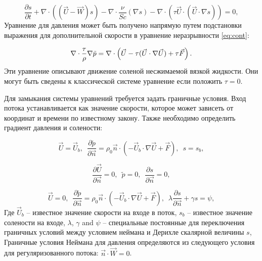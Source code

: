\begin{equation}
     \frac{\partial s }{\partial t} + \nabla \cdot \left ( (\vec U - \vec W) s \right )
      - \nabla \cdot \frac{\nu}{Sc} \left ( \nabla s \right ) - \nabla \cdot \left (\tau \vec{U} \cdot (\vec{U} \cdot \nabla s) \right) = 0,
\end{equation}
Уравнение для давления может быть получено напрямую путем подстановки выражения для дополнительной скорости в уравнение неразрывности \ref{eq:cont}:

\begin{equation}
     \nabla \cdot \frac{\tau}{\rho}\nabla \Tilde{p} = \nabla \cdot \left (   \vec{U} - \tau (\vec{U} \cdot \nabla \vec{U}) +  \tau \vec{F} \right ).
\end{equation}
Эти уравнение описывают движение соленой несжимаемой вязкой жидкости. Они могут быть сведены к классической системе уравнение если положить $\tau = 0$.

Для замыкания системы уравнений требуется задать граничные условия. Вход потока устанавливается как значение скорости, которое может зависеть от координат и времени по известному закону. Также необходимо определить градиент давления и солености:



\begin{equation}\label{eq:qhd_inlet}
    \vec{U} = \vec{U}_b, \,\,\, \frac{\partial \tilde p}{ \partial \vec{n}} = \rho_0 \vec n \cdot \left ( -\vec U_b \cdot \nabla \vec U + \vec F \right), \,\,\, s = s_b,
\end{equation}  

\begin{equation}\label{eq:qhd_outlet}
        \frac{\partial \vec{U}}{\partial \vec{n}} = 0, \,\,\, \tilde p = 0, \,\,\, \frac{\partial s}{ \partial \vec{n}} = 0,
\end{equation}

\begin{equation}\label{eq:qhd_walls}
        \vec{U} = 0, \,\,\, \frac{\partial \tilde p}{ \partial \vec{n}} = \rho_0 \vec n \cdot \left ( -\vec U_b \cdot \nabla \vec U + \vec F \right), \,\,\, \lambda \frac{\partial s}{ \partial \vec{n}} + \gamma s = \psi,
\end{equation}
Где $\vec U_b$ -- известное значение скорости на входе в поток,
$s_b$ -- известное значение солености на входе,
$\lambda$, $\gamma$ and $\psi$ -- специальные постоянные для переключения граничных условий между условием неймана и Дерихле скалярной величины $s$,
Граничные условия Неймана для давления определяются из следующего условия для регуляризованного потока:
$\vec n \cdot \vec W = 0$.


